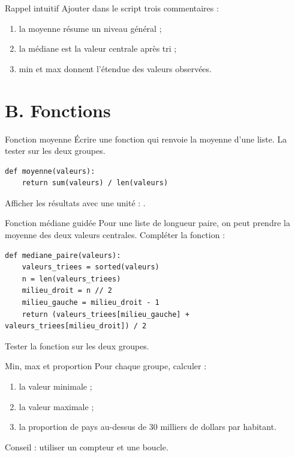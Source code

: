 \documentclass[11pt,a4paper]{article}
\begin{document}
\begin{mandatoryexercise}{Rappel intuitif}
Ajouter dans le script trois commentaires :
\begin{enumerate}
  \item la moyenne résume un niveau général ;
  \item la médiane est la valeur centrale après tri ;
  \item min et max donnent l'étendue des valeurs observées.
\end{enumerate}
\end{mandatoryexercise}

\section*{B. Fonctions}

\begin{mandatoryexercise}{Fonction moyenne}
Écrire une fonction  qui renvoie la moyenne d'une liste. La tester sur les deux groupes.
\begin{lstlisting}
def moyenne(valeurs):
    return sum(valeurs) / len(valeurs)
\end{lstlisting}
Afficher les résultats avec une unité : .
\end{mandatoryexercise}

\begin{mandatoryexercise}{Fonction médiane guidée}
Pour une liste de longueur paire, on peut prendre la moyenne des deux valeurs centrales. Compléter la fonction :
\begin{lstlisting}
def mediane_paire(valeurs):
    valeurs_triees = sorted(valeurs)
    n = len(valeurs_triees)
    milieu_droit = n // 2
    milieu_gauche = milieu_droit - 1
    return (valeurs_triees[milieu_gauche] + valeurs_triees[milieu_droit]) / 2
\end{lstlisting}
Tester la fonction sur les deux groupes.
\end{mandatoryexercise}

\begin{mandatoryexercise}{Min, max et proportion}
Pour chaque groupe, calculer :
\begin{enumerate}
  \item la valeur minimale ;
  \item la valeur maximale ;
  \item la proportion de pays au-dessus de 30 milliers de dollars par habitant.
\end{enumerate}
Conseil : utiliser un compteur et une boucle.
\end{mandatoryexercise}
\end{document}
